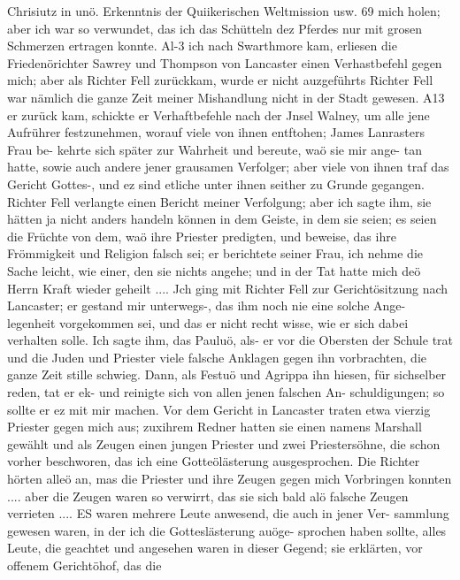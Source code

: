 Chrisiutz in unö. Erkenntnis der Quiikerischen Weltmission usw. 69
mich holen; aber ich war so verwundet, das ich das Schütteln
dez Pferdes nur mit grosen Schmerzen ertragen konnte. Al-3 ich
nach Swarthmore kam, erliesen die Friedenörichter Sawrey und
Thompson von Lancaster einen Verhastbefehl gegen mich; aber
als Richter Fell zurückkam, wurde er nicht auzgeführts Richter
Fell war nämlich die ganze Zeit meiner Mishandlung nicht in
der Stadt gewesen. A13 er zurück kam, schickte er Verhaftbefehle
nach der Jnsel Walney, um alle jene Aufrührer festzunehmen,
worauf viele von ihnen entftohen; James Lanrasters Frau be-
kehrte sich später zur Wahrheit und bereute, waö sie mir ange-
tan hatte, sowie auch andere jener grausamen Verfolger; aber
viele von ihnen traf das Gericht Gottes-, und ez sind etliche unter
ihnen seither zu Grunde gegangen. Richter Fell verlangte einen
Bericht meiner Verfolgung; aber ich sagte ihm, sie hätten ja nicht
anders handeln können in dem Geiste, in dem sie seien; es seien
die Früchte von dem, waö ihre Priester predigten, und beweise,
das ihre Frömmigkeit und Religion falsch sei; er berichtete seiner
Frau, ich nehme die Sache leicht, wie einer, den sie nichts angehe;
und in der Tat hatte mich deö Herrn Kraft wieder geheilt ....
Jch ging mit Richter Fell zur Gerichtösitzung nach Lancaster;
er gestand mir unterwegs-, das ihm noch nie eine solche Ange-
legenheit vorgekommen sei, und das er nicht recht wisse, wie
er sich dabei verhalten solle. Ich sagte ihm, das Pauluö, als-
er vor die Obersten der Schule trat und die Juden und Priester
viele falsche Anklagen gegen ihn vorbrachten, die ganze Zeit stille
schwieg. Dann, als Festuö und Agrippa ihn hiesen, für sichselber
reden, tat er ek- und reinigte sich von allen jenen falschen An-
schuldigungen; so sollte er ez mit mir machen. Vor dem Gericht
in Lancaster traten etwa vierzig Priester gegen mich aus; zuxihrem
Redner hatten sie einen namens Marshall gewählt und als
Zeugen einen jungen Priester und zwei Priestersöhne, die schon
vorher beschworen, das ich eine Gotteölästerung ausgesprochen.
Die Richter hörten alleö an, mas die Priester und ihre Zeugen
gegen mich Vorbringen konnten .... aber die Zeugen waren
so verwirrt, das sie sich bald alö falsche Zeugen verrieten ....
ES waren mehrere Leute anwesend, die auch in jener Ver-
sammlung gewesen waren, in der ich die Gotteslästerung auöge-
sprochen haben sollte, alles Leute, die geachtet und angesehen waren
in dieser Gegend; sie erklärten, vor offenem Gerichtöhof, das die


